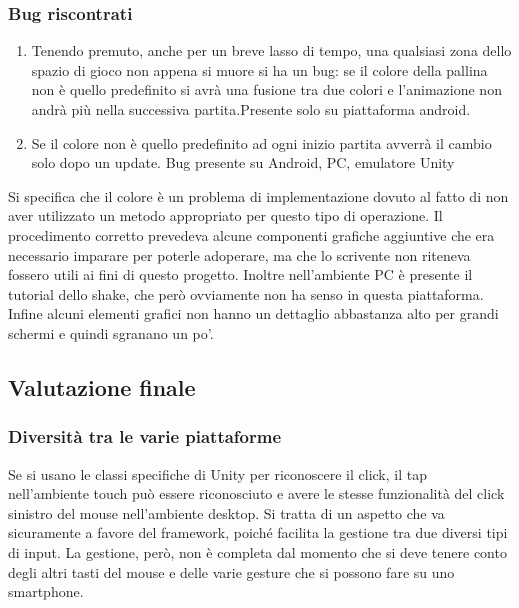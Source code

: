 \subsubsection{Bug riscontrati}
\begin{enumerate}
\item Tenendo premuto, anche per un breve lasso di tempo, una qualsiasi zona dello spazio di gioco non appena si muore si ha un bug: se il colore della pallina non è quello predefinito si avrà una fusione tra due colori e l’animazione non andrà più nella successiva partita.Presente solo su piattaforma android.
\item Se il colore non è quello predefinito ad ogni inizio partita avverrà il cambio solo dopo un update. Bug presente su Android, PC, emulatore Unity
\end{enumerate}

Si specifica che il colore è un problema di implementazione dovuto al fatto di non aver utilizzato un metodo appropriato per questo tipo di operazione. Il procedimento corretto prevedeva alcune componenti grafiche aggiuntive che era necessario imparare per poterle adoperare, ma che lo scrivente non riteneva fossero utili ai fini di questo progetto. Inoltre nell’ambiente PC è presente il tutorial dello shake, che però ovviamente non ha senso in questa piattaforma. Infine alcuni elementi grafici non hanno un dettaglio abbastanza alto per grandi schermi e quindi sgranano un po'.



\subsection{Valutazione finale}

\subsubsection{Diversità tra le varie piattaforme}
Se si usano le classi specifiche di Unity per riconoscere il click, il tap nell’ambiente touch può essere riconosciuto e avere le stesse funzionalità del click sinistro del mouse nell’ambiente desktop. Si tratta di un aspetto che va sicuramente a favore del framework, poiché facilita la gestione tra due diversi tipi di input. La gestione, però, non è completa dal momento che si deve tenere conto degli altri tasti del mouse e delle varie gesture che si possono fare su uno smartphone.

